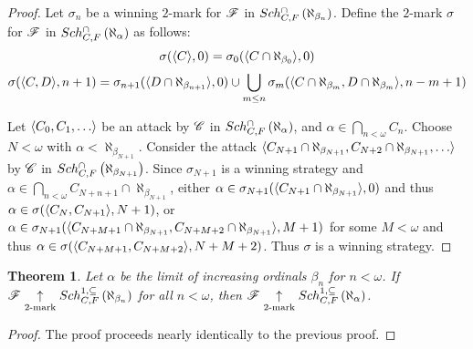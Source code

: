 \documentclass{amsart}
\theoremstyle{plain}
\newtheorem{theorem}{Theorem}
\theoremstyle{definition}
\theoremstyle{remark}
\theoremstyle{plain}
\theoremstyle{definition}
\theoremstyle{remark}
\begin{document}
  \begin{proof}
    Let \(\sigma_n\) be a winning \(2\)-mark for \(\mathscr{F}\) in
    \(Sch^{\cap}_{C,F}\left({\aleph_{\beta_n}}\right)\). Define the \(2\)-mark \(\sigma\)
    for \(\mathscr{F}\) in \(Sch^{\cap}_{C,F}\left({\aleph_\alpha}\right)\) as follows:
    \[
      \sigma(\langle C\rangle,0)
        =
      \sigma_0(\langle C\cap\aleph_{\beta_0}\rangle,0)
    \]
    \[
      \sigma(\langle C,D\rangle,n+1)
        =
      \sigma_{n+1}(\langle D\cap\aleph_{\beta_{n+1}}\rangle,0)
        \cup
      \bigcup_{m\leq n}
      \sigma_m(\langle C\cap\aleph_{\beta_m},D\cap\aleph_{\beta_m}\rangle,n-m+1)
    \]

    Let \(\<C_0,C_1,\dots\>\) be an attack by
    \(\mathscr{C}\) in \(Sch^{\cap}_{C,F}\left({\aleph_\alpha}\right)\), and
    \(\alpha\in\bigcap_{n<\omega}C_n\).
    Choose \(N<\omega\) with \(\alpha<\aleph_{\beta_{N+1}}\). Consider the
    attack
    \(\<C_{N+1}\cap\aleph_{\beta_{N+1}},C_{N+2}\cap\aleph_{\beta_{N+1}},\dots\>\)
    by \(\mathscr{C}\) in \(Sch^{\cap}_{C,F}\left({\aleph_{\beta_{N+1}}}\right)\). Since
    \(\sigma_{N+1}\) is a winning strategy and
    \(\alpha\in\bigcap_{n<\omega}C_{N+n+1}\cap\aleph_{\beta_{N+1}}\), either
    \(\alpha\in\sigma_{N+1}(\langle C_{N+1}\cap\aleph_{\beta_{N+1}}\rangle,0)\) and thus
    \(\alpha\in\sigma(\langle C_N,C_{N+1}\rangle,N+1)\), or
    \(
      \alpha
        \in
      \sigma_{N+1}(
        \langle C_{N+M+1}\cap\aleph_{\beta_{N+1}},C_{N+M+2}\cap\aleph_{\beta_{N+1}}\rangle
        ,M+1
      )
    \)
    for some \(M<\omega\) and thus
    \(
      \alpha
        \in
      \sigma(
        \langle C_{N+M+1},C_{N+M+2}\rangle,
        N+M+2
      )
    \). Thus \(\sigma\) is a winning strategy.
  \end{proof}

  \begin{theorem}
    Let \(\alpha\) be the limit of increasing ordinals \(\beta_n\) for \(n<\omega\).
    If \(\mathscr{F} \underset{2\text{-mark}}{\uparrow}Sch^{1,\subseteq}_{C,F}\left({\aleph_{\beta_n}}\right)\) for all
    \(n<\omega\), then \(\mathscr{F}\underset{2\text{-mark}}{\uparrow}Sch^{1,\subseteq}_{C,F}\left({\aleph_\alpha}\right)\).
  \end{theorem}

  \begin{proof}
    The proof proceeds nearly identically to the previous proof.
  \end{proof}
\end{document}

